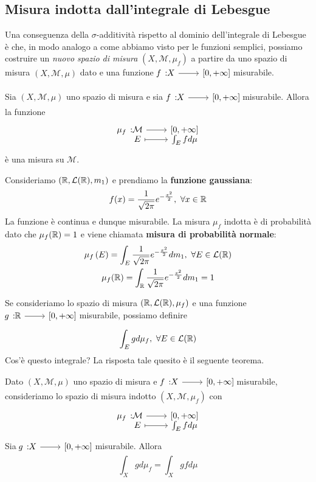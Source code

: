 \subsection{Misura indotta dall'integrale di Lebesgue}\label{misuraindotta}
Una conseguenza della $\sigma$-additività rispetto al dominio dell'integrale di Lebesgue è che, in modo analogo a come abbiamo visto per le funzioni semplici, possiamo costruire un \textit{nuovo spazio di misura} $\left(X,\mathcal{M},\mu_f\right)$ a partire da uno spazio di misura $\left(X,\mathcal{M},\mu\right)$ dato e una funzione $\funz{f}{X}{\left[0,+\infty\right]}$ misurabile.
\begin{corollaryqed}
Sia $\left(X,\mathcal{M},\mu\right)$ uno spazio di misura e sia $\funz{f}{X}{\left[0,+\infty\right]}$ misurabile. Allora la funzione
\begin{equation}
	\funztot{\mu_f}{\mathcal{M}}{\left[0,+\infty\right]}{E}{\int_Efd\mu}
\end{equation}
è una misura su $\mathcal{M}$.
\end{corollaryqed}
\begin{example}\label{gaussiana}
	Consideriamo $\left(\mathbb{R},\mathcal{L}(\mathbb{R}),m_1\right)$ e prendiamo la \textbf{funzione gaussiana}:
	\begin{equation*}
		f(x)=\frac{1}{\sqrt{2\pi}}e^{-\frac{x^2}{2}},\ \forall x\in\realset
	\end{equation*}
	La funzione è continua e dunque misurabile. La misura $\mu_f$ indotta è di probabilità dato che $\mu_f(\mathbb{R})=1$ e viene chiamata \textbf{misura di probabilità normale}:
	\begin{gather*}
		\mu_f\left(E\right)=\int_E\frac{1}{\sqrt{2\pi}}e^{-\frac{x^2}{2}}dm_1,\ \forall E\in\mathcal{L}(\realset)\\
		\mu_f(\realset)=\int_{\realset}\frac{1}{\sqrt{2\pi}}e^{-\frac{x^2}{2}}dm_1=1
	\end{gather*}
\end{example}
Se consideriamo lo spazio di misura $\left(\mathbb{R},\mathcal{L}(\mathbb{R}),\mu_f\right)$ e una funzione $\funz{g}{\realset}{\left[0,+\infty\right]}$ misurabile, possiamo definire \begin{equation*}
	\int_Egd\mu_f,\ \forall E\in\mathcal{L}(\mathbb{R})
\end{equation*}
Cos'è questo integrale? La risposta tale quesito è il seguente teorema.
\begin{theorema}
	Dato $\left(X,\mathcal{M},\mu\right)$ uno spazio di misura e $\funz{f}{X}{\left[0,+\infty\right]}$ misurabile, consideriamo lo spazio di misura indotto $\left(X,\mathcal{M},\mu_f\right)$ con
	\begin{equation*}
		\funztot{\mu_f}{\mathcal{M}}{\left[0,+\infty\right]}{E}{\int_Efd\mu}
	\end{equation*}
	Sia $\funz{g}{X}{\left[0,+\infty\right]}$ misurabile. Allora
	\begin{equation}
		\int_Xgd\mu_f=\int_Xgfd\mu
	\end{equation}
\end{theorema}
